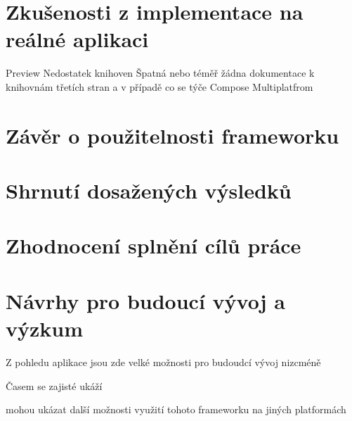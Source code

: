 \section{Zkušenosti z implementace na reálné aplikaci}
Preview
Nedostatek knihoven
Špatná nebo téměř žádna dokumentace k knihovnám třetích stran a v případě co se týče Compose Multiplatfrom
\section{Závěr o použitelnosti frameworku}



\section{Shrnutí dosažených výsledků}
\section{Zhodnocení splnění cílů práce}
\section{Návrhy pro budoucí vývoj a výzkum}
Z pohledu aplikace jsou zde velké možnosti pro budoudcí vývoj nizcméně 


Časem se zajisté ukáží

\bigskip

mohou ukázat další možnosti využití tohoto frameworku na jiných platformách


